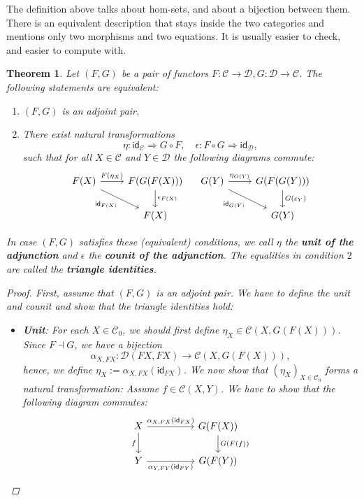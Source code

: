 \documentclass[a4paper,11pt, oneside,titlepage=false]{scrbook}
\theoremstyle{plain}
\newtheorem{thm}{Theorem}
\theoremstyle{definition}
\newcommand{\cfont}[1]{\ensuremath{\mathsf{#1}}}
\newcommand{\Cat}[1]{\mathcal{#1}}
\newcommand{\CC}{\Cat{C}}
\newcommand{\DD}{\Cat{D}}
\newcommand{\Ob}[1]{{#1}_0}
\newcommand{\CHom}[3]{{#1}(#2,#3)}
\newcommand{\Id}[1][]{\cfont{id}_{#1}}
\newcommand{\NatTrans}[3]{#1 : #2 \Rightarrow #3}
\newcommand{\co}[2]{\ensuremath{#2 \circ #1}}
\begin{document}
The definition above talks about hom-sets, and about a bijection between them.
There is an equivalent description that stays inside the two categories and
mentions only two morphisms and two equations.
It is usually easier to check, and easier to compute with.

\begin{thm} Let $(F,G)$ be a pair of functors $F : \CC\to\DD, G: \DD\to\CC$. The following statements are equivalent:
\begin{enumerate}
\item $(F,G)$ is an adjoint pair.
\item There exist natural transformations
\[
\NatTrans{\eta}{\Id[\CC]}{\co{F}{G}}, \quad \NatTrans{\epsilon}{\co{G}{F}}{\Id[\DD]},
\]
such that for all $X\in\CC$ and $Y\in\DD$ the following diagrams commute:
\[
\begin{tikzcd}
F(X) \arrow[r,"{F(\eta_X)}"] \arrow[rd,swap, "{\Id[F(X)]}"] & F(G(F(X))) \arrow[d, "{\epsilon_{F(X)}}"] \\
& F(X)
\end{tikzcd} \quad
\begin{tikzcd}
G(Y) \arrow[r,"{\eta_{G(Y)}}"] \arrow[rd,swap, "{\Id[G(Y)]}"] & G(F(G(Y))) \arrow[d, "{G(\epsilon_{Y})}"] \\
& G(Y)
\end{tikzcd}
\]
\end{enumerate}
In case $(F,G)$ satisfies these (equivalent) conditions, we call $\eta$ the \textbf{unit of the adjunction} and $\epsilon$ the \textbf{counit of the adjunction}. The equalities in condition $2$ are called the \textbf{triangle identities}.
\begin{proof}
First, assume that $(F,G)$ is an adjoint pair. We have to define the unit and counit and show that the triangle identities hold:
\begin{itemize}
\item \textbf{Unit}: For each $X\in\Ob{\CC}$, we should first define $\eta_X \in \CHom{\CC}{X}{G(F(X))}$. Since $F \dashv G$, we have a bijection
\[
\alpha_{X,FX} : \CHom{\DD}{FX}{FX} \to \CHom{\CC}{X}{G(F(X))},
\]
hence, we define $\eta_X := \alpha_{X,FX}(\Id[FX])$. We now show that $(\eta_X)_{X\in\Ob{\CC}}$ forms a natural transformation: Assume $f\in\CHom{\CC}{X}{Y}$. We have to show that the following diagram commutes:
\[
\begin{tikzcd}
X \arrow[rr, "{\alpha_{X,FX}(\Id[FX])}"] \arrow[d,swap, "f"] && G(F(X)) \arrow[d, "G(F(f))"] \\
Y \arrow[rr, swap, "{\alpha_{Y,FY}(\Id[FY])}"] && G(F(Y))

\end{tikzcd}\]
\end{itemize}
\end{proof}
\end{thm}
\end{document}
